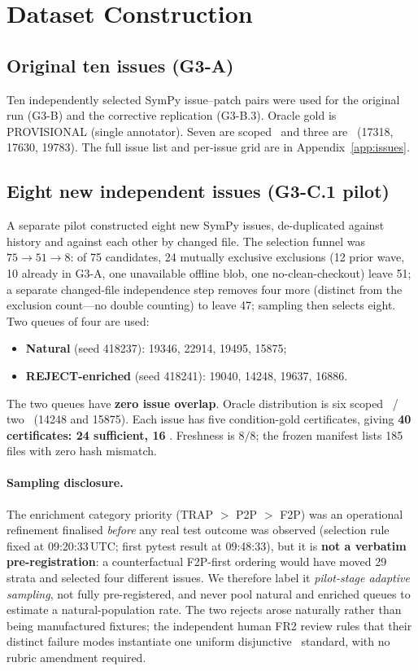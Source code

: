 \section{Dataset Construction}
\label{sec:dataset}

\subsection{Original ten issues (G3-A)}
Ten independently selected SymPy issue--patch pairs were used for the original
run (G3-B) and the corrective replication (G3-B.3). Oracle gold is
PROVISIONAL (single annotator). Seven are scoped \ACCEPT\ and three are
\REJECT\ (17318, 17630, 19783). The full issue list and per-issue grid are in
Appendix~\ref{app:issues}.

\subsection{Eight new independent issues (G3-C.1 pilot)}
A separate pilot constructed eight new SymPy issues, de-duplicated against
history and against each other by changed file. The selection funnel was
$75\rightarrow51\rightarrow8$: of 75 candidates, 24 mutually exclusive
exclusions (12 prior wave, 10 already in G3-A, one unavailable offline blob,
one no-clean-checkout) leave 51; a separate changed-file independence step
removes four more (distinct from the exclusion count---no double counting) to
leave 47; sampling then selects eight. Two queues of four are used:
\begin{itemize}[leftmargin=1.6em,itemsep=1pt,topsep=2pt]
  \item \textbf{Natural} (seed 418237): 19346, 22914, 19495, 15875;
  \item \textbf{REJECT-enriched} (seed 418241): 19040, 14248, 19637, 16886.
\end{itemize}
The two queues have \textbf{zero issue overlap}. Oracle distribution is six
scoped \ACCEPT\ / two \REJECT\ (14248 and 15875). Each issue has five
condition-gold certificates, giving \textbf{40 certificates: 24 sufficient, 16
\NEED}. Freshness is $8/8$; the frozen manifest lists 185 files with zero hash
mismatch.

\paragraph{Sampling disclosure.}
The enrichment category priority (TRAP $>$ P2P $>$ F2P) was an operational
refinement finalised \emph{before} any real test outcome was observed (selection
rule fixed at 09:20:33\,UTC; first pytest result at 09:48:33), but it is
\textbf{not a verbatim pre-registration}: a counterfactual F2P-first ordering
would have moved 29 strata and selected four different issues. We therefore
label it \emph{pilot-stage adaptive sampling}, not fully pre-registered, and
never pool natural and enriched queues to estimate a natural-population rate.
The two rejects arose naturally rather than being manufactured fixtures;
the independent human FR2 review rules that their distinct failure modes
instantiate one uniform disjunctive \REJECT\ standard, with no rubric
amendment required.

